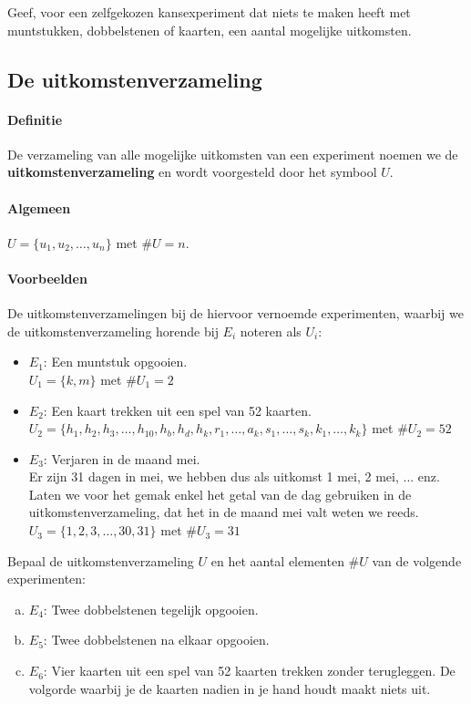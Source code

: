 \documentclass[12pt,twoside]{article}
\begin{document}
\begin{oefening}
Geef, voor een zelfgekozen kansexperiment dat niets te maken heeft met muntstukken, dobbelstenen of kaarten, een aantal mogelijke uitkomsten.
\end{oefening}

\subsection{De uitkomstenverzameling}

\paragraph*{Definitie}
De verzameling van alle mogelijke uitkomsten van een experiment noemen we de
{\bf uitkomstenverzameling} en wordt voorgesteld door het symbool $U$.

\paragraph*{Algemeen}
$U=\{u_1, u_2, \ldots, u_n\}$ met $\#U=n$.

\paragraph*{Voorbeelden} De uitkomstenverzamelingen bij de hiervoor vernoemde experimenten, waarbij we de uitkomstenverzameling horende bij $E_i$ noteren als $U_i$:
\begin{itemize}
  \item $E_1$: Een muntstuk opgooien.\\
  $U_1 = \{k,m\}$ met $\#U_1=2$
  \item $E_2$: Een kaart trekken uit een spel van 52 kaarten.\\
  $U_2 = \{h_1, h_2, h_3, \ldots , h_{10}, h_b, h_d, h_k, r_1, \ldots, a_k, s_1, \ldots, s_k, k_1, \ldots, k_k \}$ met $\#U_2=52$
  \item $E_3$: Verjaren in de maand mei.\\
  Er zijn 31 dagen in mei, we hebben dus als uitkomst 1 mei, 2 mei, ... enz. Laten we voor het gemak enkel het getal van de dag gebruiken in de uitkomstenverzameling, dat het in de maand mei valt weten we reeds.\\
  $U_3 = \{1, 2, 3, \ldots, 30, 31\}$ met $\#U_3=31$
\end{itemize}

\begin{oefening}
Bepaal de uitkomstenverzameling $U$ en het aantal elementen $\#U$ van de volgende experimenten:
\begin{enumerate}[(a)]
  \item $E_4$: Twee dobbelstenen tegelijk opgooien.
  \item $E_5$: Twee dobbelstenen na elkaar opgooien.
  \item $E_6$: Vier kaarten uit een spel van 52 kaarten trekken zonder terugleggen. De volgorde waarbij je de kaarten nadien in je hand houdt maakt niets uit.
\end{enumerate}
\end{oefening}
\end{document}
